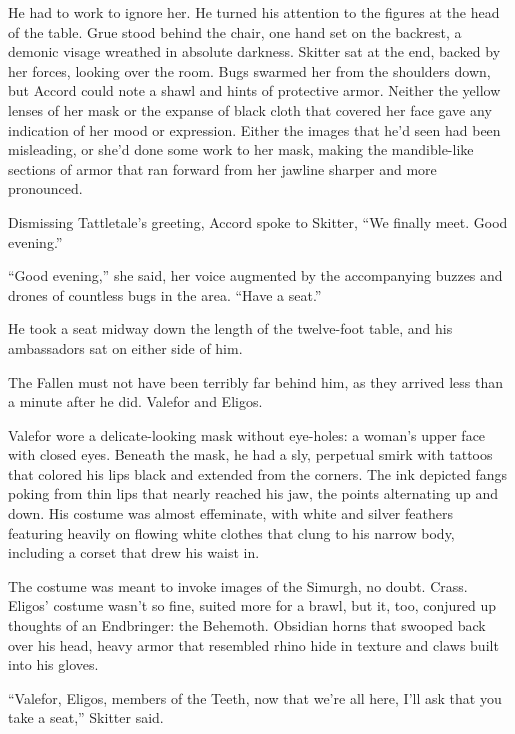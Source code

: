 He had to work to ignore her.  He turned his attention to the figures at the head of the table.  Grue stood behind the chair, one hand set on the backrest, a demonic visage wreathed in absolute darkness. Skitter sat at the end, backed by her forces, looking over the room.  Bugs swarmed her from the shoulders down, but Accord could note a shawl and hints of protective armor.  Neither the yellow lenses of her mask or the expanse of black cloth that covered her face gave any indication of her mood or expression.  Either the images that he'd seen had been misleading, or she'd done some work to her mask, making the mandible-like sections of armor that ran forward from her jawline sharper and more pronounced.



Dismissing Tattletale's greeting, Accord spoke to Skitter, ``We finally meet.  Good evening.''



``Good evening,'' she said, her voice augmented by the accompanying buzzes and drones of countless bugs in the area.  ``Have a seat.''



He took a seat midway down the length of the twelve-foot table, and his ambassadors sat on either side of him.



The Fallen must not have been terribly far behind him, as they arrived less than a minute after he did.  Valefor and Eligos.



Valefor wore a delicate-looking mask without eye-holes: a woman's upper face with closed eyes.  Beneath the mask, he had a sly, perpetual smirk with tattoos that colored his lips black and extended from the corners.  The ink depicted fangs poking from thin lips that nearly reached his jaw, the points alternating up and down.  His costume was almost effeminate, with white and silver feathers featuring heavily on flowing white clothes that clung to his narrow body, including a corset that drew his waist in.



The costume was meant to invoke images of the Simurgh, no doubt.  Crass.  Eligos' costume wasn't so fine, suited more for a brawl, but it, too, conjured up thoughts of an Endbringer: the Behemoth.  Obsidian horns that swooped back over his head, heavy armor that resembled rhino hide in texture and claws built into his gloves.



``Valefor, Eligos, members of the Teeth, now that we're all here, I'll ask that you take a seat,'' Skitter said.



